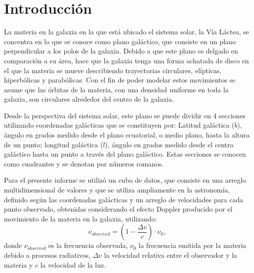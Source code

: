 \documentclass[letterpaper,oneside]{article}
\begin{document}
	
\templatePortrait

\templatePagecfg



\templateFinalcfg


\section{Introducción}
La materia en la galaxia en la que está ubicado el sistema solar, la Vía Láctea, se concentra en lo que se conoce como plano galáctico, que consiste en un plano perpendicular a los polos de la galaxia.  Debido a que este plano es delgado en comparación a su área, hace que la galaxia tenga una forma achatada de disco en el que la materia se mueve describiendo trayectorias circulares, elípticas, hiperbólicas y parabólicas. Con el fin de poder modelar estos movimientos se asume que las órbitas de la materia, con una densidad uniforme en toda la galaxia, son circulares alrededor del centro de la galaxia.

Desde la perspectiva del sistema solar, este plano se puede dividir en 4 secciones utilizando coordenadas galácticas que se constituyen por: Latitud galáctica ($b$), ángulo en grados medido desde el plano ecuatorial, o medio plano, hasta la altura de un punto; longitud galáctica ($l$), ángulo  en grados medido desde el centro galáctico hasta un punto a través del plano galáctico. Estas secciones se conocen como cuadrantes y se denotan por números romanos.

Para el presente informe se utilizó un cubo de datos, que consiste en una arreglo multidimensional de valores y que se utiliza ampliamente en la astronomía, definido según las coordenadas galácticas y un arreglo de velocidades para cada punto observado, obtenidas considerando el efecto Doppler producido por el movimiento de la materia en la galaxia, utilizando:
\[
\nu_{observed}=(1-\frac{\Delta v}{c})\cdot \nu_0,
\]
donde $\nu_{observed}$ es la frecuencia observada, $\nu_0$ la frecuencia emitida por la materia debido a procesos radiativos, $\Delta v$ la velocidad relativa entre el observador y la materia y $c$ la velocidad de la luz.
\end{document}
